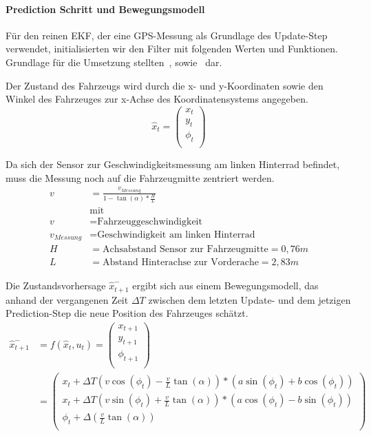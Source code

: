 \documentclass[11pt]{scrartcl}
\begin{document}
{\paragraph{Prediction Schritt und Bewegungsmodell}
Für den reinen EKF, der eine GPS-Messung als Grundlage des Update-Step verwendet, initialisierten wir den Filter mit folgenden Werten und Funktionen. Grundlage für die Umsetzung stellten~\cite{ute_SLAM}, sowie~\cite{Freiburg_SLAM_Formeln} dar.

Der Zustand des Fahrzeugs wird durch die x- und y-Koordinaten sowie den Winkel des Fahrzeuges zur x-Achse des Koordinatensystems angegeben.
\begin{equation}\label{EKF-State-Vector}
	\hat{x}_t = \begin{pmatrix}
		x_t \\
		y_t \\
		\phi_t \\
	  \end{pmatrix}
\end{equation}

Da sich der Sensor zur Geschwindigkeitsmessung am linken Hinterrad befindet, muss die Messung noch auf die Fahrzeugmitte zentriert werden.
\begin{equation}\label{Geschwindikeit}
\begin{split}
	v &= \frac{v_{Messung}}{1-\tan(\alpha)*\frac{H}{L}} \\
	&\text{mit } \\
	v &= \text{Fahrzeuggeschwindigkeit} \\
	v_{Messung} &= \text{Geschwindigkeit am linken Hinterrad} \\
	H &= \text{Achsabstand Sensor zur Fahrzeugmitte} = 0,76m \\
	L &= \text{Abstand Hinterachse zur Vorderache} = 2,83m
\end{split}
\end{equation}

Die Zustandsvorhersage $\hat{x}_{t+1}^-$ ergibt sich aus einem Bewegungsmodell, das anhand der vergangenen Zeit $\Delta T$ zwischen dem letzten Update- und dem jetzigen Prediction-Step die neue Position des Fahrzeuges schätzt. 
\begin{equation}\label{EKF-Motion-Model}
\begin{split}
	\hat{x}_{t+1}^- &= f(\hat{x}_{t},u_t) = \begin{pmatrix}
		x_{t+1} \\
		y_{t+1} \\
		\phi_{t+1} \\
	  \end{pmatrix} \\
	  &= \begin{pmatrix}
		  x_{t}+\Delta T(v\cos(\phi_t)-\frac{v}{L}\tan(\alpha))*(a\sin(\phi_t)+b\cos(\phi_t)) \\
		  x_{t}+\Delta T(v\sin(\phi_t)+\frac{v}{L}\tan(\alpha))*(a\cos(\phi_t)-b\sin(\phi_t)) \\
		  \phi_t + \Delta(\frac{v}{L}\tan(\alpha)) \\
	  \end{pmatrix}
\end{split}
\end{equation}

}
\end{document}
